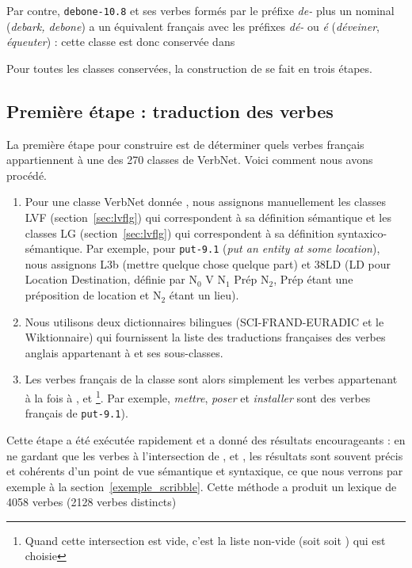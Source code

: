 Par contre, {\color{blue}\texttt{debone-10.8}} et ses verbes formés par le
préfixe \textit{de-} plus un nominal (\textit{debark, debone}) a un équivalent
français avec les préfixes \textit{dé-} ou \textit{é} (\textit{déveiner},
\textit{équeuter}) : cette classe est donc conservée dans \verbenet{}

Pour toutes les classes conservées, la construction de \verbenet{} se fait en
trois étapes.

\subsection{Première étape : traduction des verbes}\label{first}

La première étape pour construire \verbenet{} est de déterminer quels verbes
français appartiennent à une des 270 classes de VerbNet. Voici comment nous
avons procédé.

\begin{enumerate}
    \item Pour une classe VerbNet donnée \Ce{}, nous assignons manuellement les
        classes LVF (section~\ref{sec:lvflg}) \Clvf{} qui correspondent à sa
        définition sémantique et les classes LG (section~\ref{sec:lvflg})
        \Clg{} qui correspondent à sa définition syntaxico-sémantique. Par
        exemple, pour {\color{blue}\texttt{put-9.1}} (\textit{put an entity at
        some location}), nous assignons {\color{red}L3b} (mettre quelque chose
        quelque part) et {\color{green}38LD} (LD pour Location Destination,
        définie par N$_0$ V N$_1$ Prép N$_2$, Prép étant une préposition de
        location et N$_2$ étant un lieu).
    \item Nous utilisons deux dictionnaires bilingues (SCI-FRAND-EURADIC et le
        Wiktionnaire) qui fournissent la liste \Ltrad{} des traductions
        françaises des verbes anglais appartenant à \Ce{} et ses sous-classes.
    \item Les verbes français de la classe \Ce{} sont alors simplement les
        verbes appartenant à la fois à \Ltrad{}, \Clvf{} et
        \Clg{}\footnote{Quand cette intersection est vide, c'est la liste
        non-vide (soit \Clvf{} soit \Clg{}) qui est choisie}. Par exemple,
        \textit{mettre}, \textit{poser} et \textit{installer} sont des verbes
        français de {\color{blue}\texttt{put-9.1}}).
\end{enumerate}

Cette étape a été exécutée rapidement et a donné des résultats encourageants :
en ne gardant que les verbes à l'intersection de \Ltrad{}, \Clvf{} et \Clg{},
les résultats sont souvent précis et cohérents d'un point de vue sémantique et
syntaxique, ce que nous verrons par exemple à la
section~\ref{exemple_scribble}. Cette méthode a produit un lexique de 4058
verbes (2128 verbes distincts)

